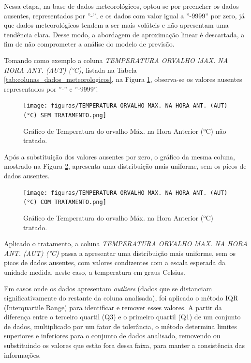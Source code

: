 Nessa etapa, na base de dados meteorológicos, optou-se por preencher os dados ausentes, representados por ''-'', e os dados com valor igual a ''-9999'' por zero, já que dados meteorológicos tendem a ser mais voláteis e não apresentam uma tendência clara. Desse modo, a abordagem de aproximação linear é descartada, a fim de não comprometer a análise do modelo de previsão.  

Tomando como exemplo a coluna \textit{TEMPERATURA ORVALHO MAX. NA HORA ANT. (AUT) (°C)}, listada na Tabela \ref{tab:colunas_dados_meteorologicos}, na Figura \ref{fig:dados_clima_poa_nao_tratados}, observa-se os valores ausentes representados por ''-'' e ''-9999''.

\begin{figure}[H]
	\caption{\label{fig:dados_clima_poa_nao_tratados}Gráfico de Temperatura do orvalho Máx. na Hora Anterior (°C) não tratado.}
	\begin{center}
		\texttt{[image: figuras/TEMPERATURA ORVALHO MAX. NA HORA ANT. (AUT) (°C) SEM TRATAMENTO.png]}
	\end{center}
\end{figure}

Após a substituição dos valores ausentes por zero, o gráfico da mesma coluna, mostrado na Figura \ref{fig:dados_clima_poa_tratados}, apresenta uma distribuição mais uniforme, sem os picos de dados ausentes.

\begin{figure}[H]
	\caption{\label{fig:dados_clima_poa_tratados}Gráfico de Temperatura do orvalho Máx. na Hora Anterior (°C) tratado.}
	\begin{center}
		\texttt{[image: figuras/TEMPERATURA ORVALHO MAX. NA HORA ANT. (AUT) (°C) COM TRATAMENTO.png]}
	\end{center}
\end{figure}

Aplicado o tratamento, a coluna \textit{TEMPERATURA ORVALHO MAX. NA HORA ANT. (AUT) (°C)} passa a apresentar uma distribuição mais uniforme, sem os picos de dados ausentes, com valores condizentes com a escala esperada da unidade medida, neste caso, a temperatura em graus Celsius.

Em casos onde os dados apresentam \textit{outliers} (dados que se distanciam significativamente do restante da coluna analisada), foi aplicado o método IQR (Interquartile Range) para identificar e remover esses valores. A partir da diferença entre o terceiro quartil (Q3) e o primeiro quartil (Q1) de um conjunto de dados, multiplicado por um fator de tolerância, o método determina limites superiores e inferiores para o conjunto de dados analisado, removendo ou substituindo os valores que estão fora dessa faixa, para manter a consistência das informações.

